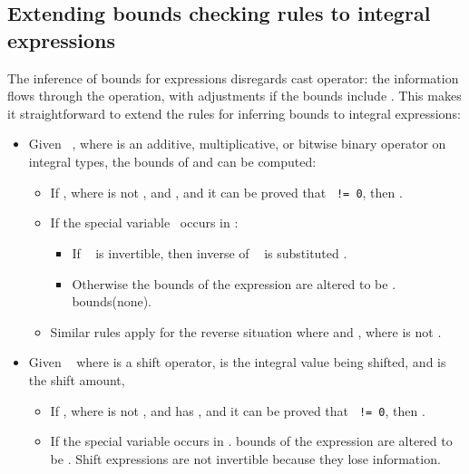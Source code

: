 \subsection{Extending bounds checking rules to integral
expressions}

The inference of bounds for expressions disregards cast operator: the 
information flows through the operation, with adjustments if the bounds
include \exprcurrentvalue.  This makes it straightforward to extend the
rules for inferring bounds to integral expressions:

\begin{itemize}
\item
  Given \texttt{  }, where  is an additive, multiplicative, or bitwise
  binary operator on integral types, the bounds of  and  can be
  computed:

  \begin{itemize}
  \item
    If , where  is not \boundsnone, and 
    , and it can be proved that \texttt{ != 0}, then
    .
  \item
    If the special variable \exprcurrentvalue\ occurs in :
    \begin{itemize}
    \item
      If \texttt{  } is invertible, then inverse of \texttt{  }
      is substituted \exprcurrentvalue.
    \item
      Otherwise the bounds of the expression are altered to be \boundsnone.
      bounds(none).
    \end{itemize}
  \item
    Similar rules apply for the reverse situation where 
    and , where  is not \boundsnone.
  \end{itemize}
\item
  Given \texttt{  } where  is a shift operator,  is the integral value
  being shifted, and  is the shift amount,

  \begin{itemize}
  \item
    If , where  is not \boundsnone, and  has
    \boundsnone, and it can be proved that \texttt{ != 0}, then .
  \item
    If the special variable \exprcurrentvalue occurs in .
    bounds of the expression are altered to be \boundsnone. Shift
    expressions are not invertible because they lose information.
  \end{itemize}
\end{itemize}

